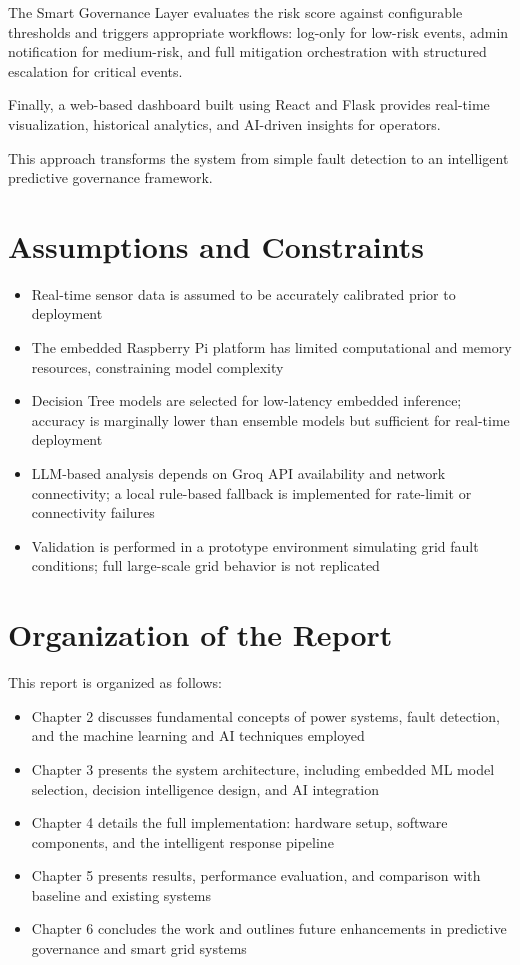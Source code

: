 The Smart Governance Layer evaluates the risk score against configurable thresholds and triggers appropriate workflows: log-only for low-risk events, admin notification for medium-risk, and full mitigation orchestration with structured escalation for critical events.

Finally, a web-based dashboard built using React and Flask provides real-time visualization, historical analytics, and AI-driven insights for operators.

This approach transforms the system from simple fault detection to an intelligent predictive governance framework.
\pagebreak
\section{\textbf{Assumptions and Constraints}}

\begin{itemize}
\setlength{\itemsep}{0pt}
\setlength{\parskip}{0pt}
\setlength{\parsep}{0pt}
\item Real-time sensor data is assumed to be accurately calibrated prior to deployment
\item The embedded Raspberry Pi platform has limited computational and memory resources, constraining model complexity
\item Decision Tree models are selected for low-latency embedded inference; accuracy is marginally lower than ensemble models but sufficient for real-time deployment
\item LLM-based analysis depends on Groq API availability and network connectivity; a local rule-based fallback is implemented for rate-limit or connectivity failures
\item Validation is performed in a prototype environment simulating grid fault conditions; full large-scale grid behavior is not replicated
\end{itemize}

\section{\textbf{Organization of the Report}}

This report is organized as follows:
\begin{itemize}
\setlength{\itemsep}{0pt}
\setlength{\parskip}{0pt}
\setlength{\parsep}{0pt}
\item Chapter 2 discusses fundamental concepts of power systems, fault detection, and the machine learning and AI techniques employed
\item Chapter 3 presents the system architecture, including embedded ML model selection, decision intelligence design, and AI integration
\item Chapter 4 details the full implementation: hardware setup, software components, and the intelligent response pipeline
\item Chapter 5 presents results, performance evaluation, and comparison with baseline and existing systems
\item Chapter 6 concludes the work and outlines future enhancements in predictive governance and smart grid systems
\end{itemize}
